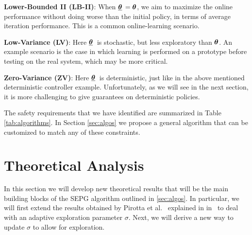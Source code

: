 \textbf{Lower-Bounded II (LB-II)}: When $\vtarget[]=\vtheta$, we aim to maximize the online performance without doing worse than the initial policy, in terms of average iteration performance. This is a common online-learning scenario.

\textbf{Low-Variance (LV)}:  Here $\vtarget[]$ is stochastic, but less exploratory than $\vtheta$. An example scenario is the case in which learning is performed on a prototype before testing on the real system, which may be more critical. 

\textbf{Zero-Variance (ZV)}: Here $\vtarget[]$ is deterministic, just like in the above mentioned deterministic controller example. Unfortunately, as we will see in the next section, it is more challenging to give guarantees on deterministic policies.  

\begin{samepage}
\begin{table}
	\caption{Overview of the safety requirements outlined in Section \ref{sec:framework}.}\label{tab:algorithms}
\end{table}

The safety requirements that we have identified are summarized in Table \ref{tab:algorithms}. In 
Section \ref{sec:algos} we propose a general algorithm that can be customized to match any of these constraints.
\end{samepage}

\section{Theoretical Analysis}\label{sec:theory}
In this section we will develop new theoretical results that will be the main building blocks of the SEPG algorithm outlined in \ref{sec:algos}. In particular, we will first extend the results obtained by Pirotta et al.~\cite{adaptive_step} explained in in~ to deal with an adaptive exploration parameter $\sigma$. Next, we will derive a new way to update $\sigma$ to allow for exploration. 

